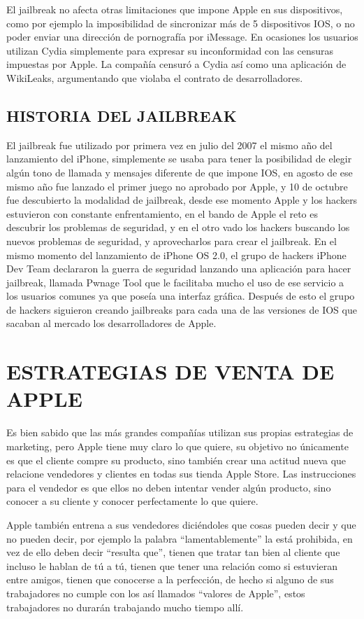 El jailbreak no afecta otras limitaciones que impone Apple en
sus dispositivos, como por ejemplo la imposibilidad de
sincronizar más de 5 dispositivos IOS, o no poder enviar una
dirección de pornografía por iMessage. En ocasiones los
usuarios utilizan Cydia simplemente para expresar su
inconformidad con las censuras impuestas por Apple. La
compañía censuró a Cydia así como una aplicación de
WikiLeaks, argumentando que violaba el contrato de
desarrolladores.

\subsection*{HISTORIA DEL JAILBREAK}

El jailbreak fue utilizado por primera vez en julio del 2007 el
mismo año del lanzamiento del iPhone, simplemente se usaba
para tener la posibilidad de elegir algún tono de llamada y
mensajes diferente de que impone IOS, en agosto de ese mismo
año fue lanzado el primer juego no aprobado por Apple, y 10 de
octubre fue descubierto la modalidad de jailbreak, desde ese
momento Apple y los hackers estuvieron con constante
enfrentamiento, en el bando de Apple el reto es descubrir los
problemas de seguridad, y en el otro vado los hackers buscando
los nuevos problemas de seguridad, y aprovecharlos para crear
el jailbreak. En el mismo momento del lanzamiento de iPhone
OS 2.0, el grupo de hackers iPhone Dev Team declararon la
guerra de seguridad lanzando una aplicación para hacer
jailbreak, llamada Pwnage Tool que le facilitaba mucho el uso de
ese servicio a los usuarios comunes ya que poseía una interfaz
gráfica. Después de esto el grupo de hackers siguieron creando
jailbreaks para cada una de las versiones de IOS que sacaban al
mercado los desarrolladores de Apple.

\section*{ESTRATEGIAS DE VENTA DE APPLE}

Es bien sabido que las más grandes compañías utilizan sus
propias estrategias de marketing, pero Apple tiene muy claro lo
que quiere, su objetivo no únicamente es que el cliente compre
su producto, sino también crear una actitud nueva que relacione
vendedores y clientes en todas sus tienda Apple Store. Las
instrucciones para el vendedor es que ellos no deben intentar
vender algún producto, sino conocer a su cliente y conocer
perfectamente lo que quiere.

Apple también entrena a sus vendedores diciéndoles que cosas
pueden decir y que no pueden decir, por ejemplo la palabra
“lamentablemente” la está prohibida, en vez de ello deben decir
“resulta que”, tienen que tratar tan bien al cliente que incluso le
hablan de tú a tú, tienen que tener una relación como si
estuvieran entre amigos, tienen que conocerse a la perfección,
de hecho si alguno de sus trabajadores no cumple con los así
llamados “valores de Apple”, estos trabajadores no durarán
trabajando mucho tiempo allí.

